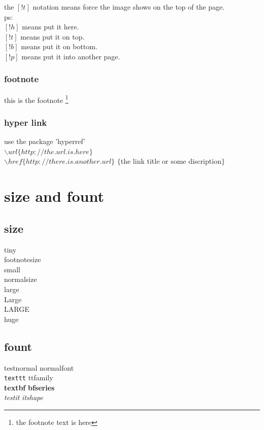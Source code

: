 \documentclass[11pt,a4paper]{article}
\begin{document}
{{{the $[!t]$ notation means force the image shows on the top of the page. \\
ps: \\
$[!h]$ means put it here. \\
$[!t]$ means put it on top. \\
$[!b]$ means put it on bottom. \\
$[!p]$ means put it into another page. \\
    }

    \subsubsection{footnote}{
      this is the footnote \footnote{the footnote text is here}
    }
    \subsubsection{hyper link}{
      use the package 'hyperref' \\
      $\backslash url\{http://the.url.is.here\}$ \\
      $\backslash href\{http://there.is.another.url\}$
      $\{$the link title or some discription$\}$
    }
  }
}

\section{size and fount}{
  \subsection{size}{
    \tiny tiny\\
    \footnotesize{footnotesize}\\ 
    {\small small}\\
    \normalsize normalsize\\
    \large large\\
    \Large Large\\
    \LARGE LARGE\\
    \huge huge
  }
  \subsection{fount}{
    \textnormal{testnormal} {\normalfont normalfont}\\
    \texttt{texttt} {\ttfamily ttfamily}\\
    \textbf{textbf} {\bfseries bfseries}\\
    \textit{testit} {\itshape itshape}
  }
}
\end{document}

